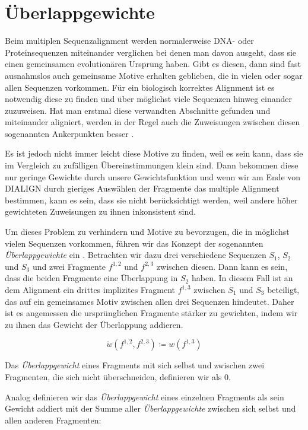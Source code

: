 \section{Überlappgewichte}\label{sec:ueberlapp}

Beim multiplen Sequenzalignment werden normalerweise DNA- oder Proteinsequenzen miteinander verglichen bei denen man davon ausgeht, dass sie einen gemeinsamen evolutionären Ursprung haben. Gibt es diesen, dann sind fast ausnahmslos auch gemeinsame Motive erhalten geblieben, die in vielen oder sogar allen Sequenzen vorkommen. Für ein biologisch korrektes Alignment ist es notwendig diese zu finden und über möglichst viele Sequenzen hinweg einander zuzuweisen. Hat man erstmal diese verwandten Abschnitte gefunden und miteinander aligniert, werden in der Regel auch die Zuweisungen zwischen diesen sogenannten Ankerpunkten besser \citep{mpps06}.

Es ist jedoch nicht immer leicht diese Motive zu finden, weil es sein kann, dass sie im Vergleich zu zufälligen Übereinstimmungen klein sind. Dann bekommen diese nur geringe Gewichte durch unsere Gewichtsfunktion und wenn wir am Ende von DIALIGN	durch gieriges Auswählen der Fragmente das multiple Alignment bestimmen, kann es sein, dass sie nicht berücksichtigt werden, weil andere höher gewichteten Zuweisungen zu ihnen inkonsistent sind. 

Um dieses Problem zu verhindern und Motive zu bevorzugen, die in möglichst vielen Sequenzen vorkommen, führen wir das Konzept der sogenannten \emph{Überlappgewichte} ein \citep{mdw96}. Betrachten wir dazu drei verschiedene Sequenzen $S_1$, $S_2$ und $S_3$ und zwei Fragmente $f^{1,2}$ und $f^{2,3}$ zwischen diesen. Dann kann es sein, dass die beiden Fragmente eine Überlappung in $S_2$ haben. In diesem Fall ist an dem Alignment ein drittes implizites Fragment $f^{1,3}$ zwischen $S_1$ und $S_3$ beteiligt, das auf ein gemeinsames Motiv zwischen allen drei Sequenzen hindeutet. Daher ist es angemessen die ursprünglichen Fragmente stärker zu gewichten, indem wir zu ihnen das Gewicht der Überlappung addieren.

\begin{equation}
	\tilde{w}(f^{1,2},f^{2,3}) \coloneqq w(f^{1,3})
\end{equation}

Das \emph{Überlappgewicht} eines Fragments mit sich selbst und zwischen zwei Fragmenten, die sich nicht überschneiden, definieren wir als 0.

Analog definieren wir das \emph{Überlappgewicht} eines einzelnen Fragments als sein Gewicht addiert mit der Summe aller \emph{Überlappgewichte} zwischen sich selbst und allen anderen Fragmenten:

